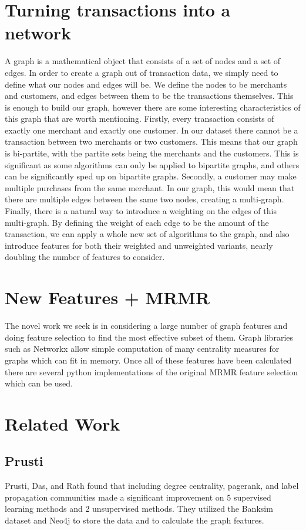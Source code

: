 \documentclass{article}
\begin{document}
\section{Turning transactions into a network}
	A graph is a mathematical object that consists of a set of nodes and a set of edges. In order to create a graph out of transaction data, we simply need to define what our nodes and edges will be. We define the nodes to be merchants and customers, and edges between them to be the transactions themselves. This is enough to build our graph, however there are some interesting characteristics of this graph that are worth mentioning. Firstly, every transaction consists of exactly one merchant and exactly one customer. In our dataset there cannot be a transaction between two merchants or two customers. This means that our graph is bi-partite, with the partite sets being the merchants and the customers. This is significant as some algorithms can only be applied to bipartite graphs, and others can be significantly sped up on bipartite graphs. Secondly, a customer may make multiple purchases from the same merchant. In our graph, this would mean that there are multiple edges between the same two nodes, creating a multi-graph. Finally, there is a natural way to introduce a weighting on the edges of this multi-graph. By defining the weight of each edge to be the amount of the transaction, we can apply a whole new set of algorithms to the graph, and also introduce features for both their weighted and unweighted variants, nearly doubling the number of features to consider. 

\section{New Features + MRMR}
	The novel work we seek is in considering a large number of graph features and doing feature selection to find the most effective subset of them. Graph libraries such as Networkx allow simple computation of many centrality measures for graphs which can fit in memory. Once all of these features have been calculated there are several python implementations of the original MRMR feature selection which can be used. 

\section{Related Work}
\subsection{Prusti}
	Prusti, Das, and Rath found that including degree centrality, pagerank, and label propagation communities made a significant improvement on 5 supervised learning methods and 2 unsupervised methods\cite{graphdb}.  They utilized the Banksim dataset and Neo4j to store the data and to calculate the graph features. 
\end{document}
